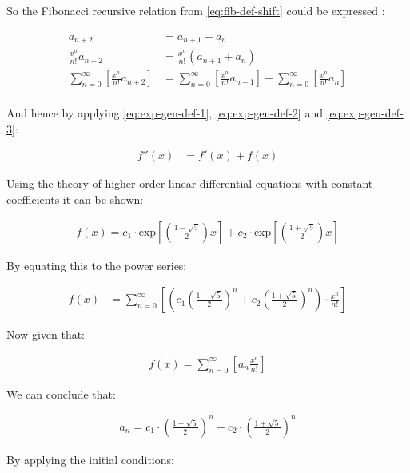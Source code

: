 \documentclass[a4paper,11pt,twoside]{article}
\begin{document}
So the Fibonacci recursive relation from \eqref{eq:fib-def-shift}  could be expressed :


\begin{align*}
a_{n+  2}    &= a_{n+  1} +  a_{n}\\
\frac{x^n}{n!}   a_{n+  2}    &= \frac{x^n}{n!}\left( a_{n+  1} +  a_{n}  \right)\\
\sum^{\infty}_{n= 0} \left[ \frac{x^n}{n!}   a_{n+  2} \right]        &= \sum^{\infty}_{n= 0}   \left[ \frac{x^n}{n!} a_{n+  1} \right]  + \sum^{\infty}_{n= 0}   \left[ \frac{x^n}{n!} a_{n}  \right]  \\
\end{align*}

And hence by applying \eqref{eq:exp-gen-def-1}, \eqref{eq:exp-gen-def-2} and \eqref{eq:exp-gen-def-3}:

\begin{align}
f''\left( x \right) &= f'\left( x \right)+  f\left( x \right)
\end{align}


Using the theory of higher order linear differential equations with
constant coefficients it can be shown:


\begin{align*}
f\left( x \right)= c_1 \cdot  \mathrm{exp}\left[ \left( \frac{1- \sqrt{5} }{2} \right)x \right] +  c_2 \cdot  \mathrm{exp}\left[ \left( \frac{1 +  \sqrt{5} }{2} \right)x \right]
\end{align*}


By equating this to the power series:


\begin{align*}
f\left( x \right)&= \sum^{\infty}_{n= 0}   \left[ \left( c_1\left( \frac{1- \sqrt{5} }{2} \right)^n +  c_2  \left( \frac{1+ \sqrt{5} }{2} \right)^n \right) \cdot  \frac{x^n}{n!} \right]
\end{align*}


Now given that:


\begin{align*}
f\left( x \right)= \sum^{\infty}_{n= 0}   \left[ a_n \frac{x^n}{n!} \right]
\end{align*}


We can conclude that:


\begin{align*}
a_n = c_1\cdot  \left( \frac{1- \sqrt{5} }{2} \right)^n +  c_2 \cdot  \left( \frac{1+  \sqrt{5} }{2} \right)^n
\end{align*}


By applying the initial conditions:
\end{document}
